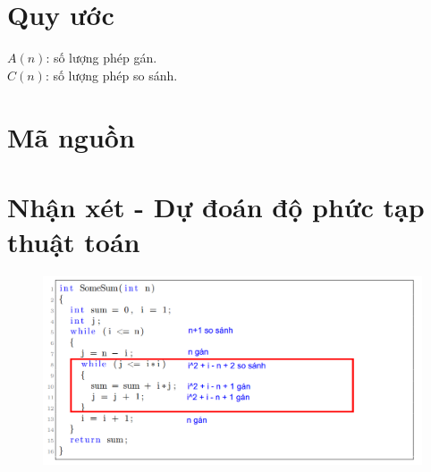 \documentclass{article}
\begin{document}
\section{Quy ước}
	\begin{flushleft}
		$A(n)$: số lượng phép gán.\\
		$C(n)$: số lượng phép so sánh.
	\end{flushleft}


\section{Mã nguồn}



\section{Nhận xét - Dự đoán độ phức tạp thuật toán}
	\begin{figure}[H]
		\includegraphics[scale = 0.5]{Calculate}
	\end{figure}
\end{document}
